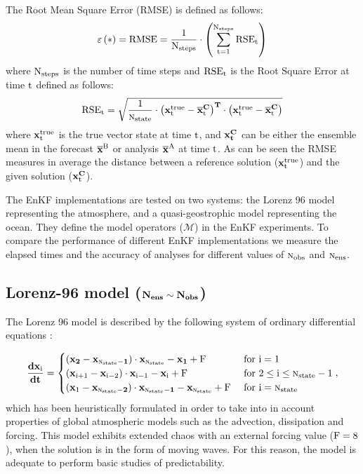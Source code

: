 \documentclass[12pt]{article}
\newcommand{\Nobs}{\textsc{n}_{{\rm obs}}}
\newcommand{\Nens}{\textsc{n}_{{\rm ens}}}
\newcommand{\Nstate}{\textsc{n}_{{\rm state}}}
\newcommand{\xmean}{{\bf \overline{x}}^{\rm B}}
\newcommand{\xmeana}{{\bf \overline{x}}^{\rm A}}
\newcommand{\xt}{{\bf x}^{\rm true}}
\newcommand{\N}{{\bf N}}
\newcommand{\Lorenz}{{\bf \frac{dx_{\rm i}}{dt}} = \begin{cases}
 \left ({{\bf x_{2}}-{\bf x_{\Nstate-1}}} \right ) \cdot {\bf x_{\Nstate}}-{\bf x_{1}}+{\rm F} & \text{ for $\rm i = 1$} \\
 \left ({{\bf x_{\rm i+1}}-{\bf x_{\rm i-2}}} \right ) \cdot {\bf x_{\rm i-1}}-{\bf x_{\rm i}}+{\rm F} & \text{ for $2 \le \rm  i 
\le \Nstate-1$} \\
\left ({{\bf x_{\rm 1}}-{\bf x_{\Nstate-2}}} \right ) \cdot {\bf x_{\Nstate-1}}-{\bf x_{\Nstate}}+{\rm F} & \text{ for $\rm i =  \Nstate$}
\end{cases}}
\begin{document}
The Root Mean Square Error (RMSE) is defined as follows:
\begin{eqnarray} \nonumber
\displaystyle \varepsilon \left ( * \right ) = {\rm RMSE} = \frac{1}{{\rm N_{steps}}} \cdot \left ( \sum_{{\rm t = 1}}^{{\rm N_{steps}}}{{\rm RSE}_{{\rm t}}} \right )
\end{eqnarray}
where ${\rm N_{steps}}$ is the number of time steps and ${\rm RSE_t}$ is the Root Square Error at time $\rm t$ defined as follows:
\begin{eqnarray} \nonumber
\displaystyle {\rm RSE_t} = \sqrt{\frac{1}{\Nstate} \cdot \left( \xt_{\rm t}-{\bf \overline{x}^C_{\rm t}}\right)^{\bf T} \cdot \left(\xt_{\rm t}-{\bf \overline{x}^C_{\rm t}} \right)}
\end{eqnarray}
where $\xt_{\rm t}$ is the true vector state at time $\rm t$, and ${\bf x^C_t}$ can be either the ensemble mean in the forecast $\xmean$ or analysis $\xmeana$ at time $\rm t$. As can be seen the  RMSE measures in average the distance between a reference solution ($\xt_{\rm t}$) and the given solution (${\bf x^C_{\rm t}}$).

The EnKF implementations are tested on two systems: the Lorenz 96 model \cite{Lorenz98} representing the atmosphere, and a quasi-geostrophic model \cite{Carton94} representing the ocean. They define the model operators ($\mathcal M$) in the EnKF experiments. To compare the performance of different EnKF implementations we measure the elapsed times and the accuracy of analyses for different values of $\Nobs$ and $\Nens$. 

\subsection{Lorenz-96 model ($\bf \N_{ens} \sim \N_{obs}$)}
\label{Results:Lorenz-Model}


The Lorenz 96 model is described by the following system of ordinary differential equations \cite{Lorenz98}:

\begin{eqnarray} \label{eqn:Lorenz96}
\displaystyle \Lorenz,
\end{eqnarray}
which has been heuristically formulated in order to take into in account properties of global atmospheric models such as the advection,  dissipation and forcing. This model exhibits extended chaos with an external forcing value ($\rm F=8$), when the solution is in the form of moving waves. For this reason, the model is adequate to perform basic studies of predictability.
\end{document}
